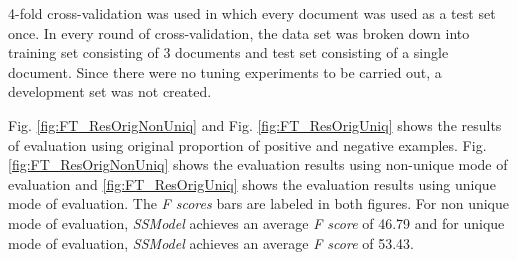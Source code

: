 4-fold cross-validation was used in which every document was used as a test set once. In every round of cross-validation, the data set was broken down into training set consisting of 3 documents and test set consisting of a single document. Since there were no tuning experiments to be carried out, a development set was not created.

Fig. \ref{fig:FT_ResOrigNonUniq} and Fig. \ref{fig:FT_ResOrigUniq} shows the results of evaluation using original proportion of positive and negative examples.  Fig. \ref{fig:FT_ResOrigNonUniq} shows the evaluation results using non-unique mode of evaluation and \ref{fig:FT_ResOrigUniq} shows the evaluation results using unique mode of evaluation. The \textit{F scores} bars are labeled in both figures. For non unique mode of evaluation, \textit{SSModel} achieves an average \textit{F score} of 46.79 and for unique mode of evaluation, \textit{SSModel} achieves an average \textit{F score} of 53.43.


